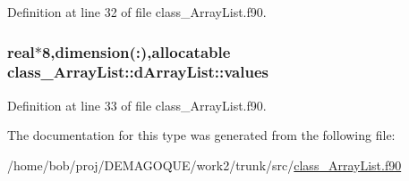 Definition at line 32 of file class\_\-ArrayList.f90.

\hypertarget{typeclass__ArrayList_1_1dArrayList_a7972abce1835eeb0be28d57f59de952e}{
\subsubsection[{values}]{\setlength{\rightskip}{0pt plus 5cm}real$\ast$8,dimension(:),allocatable {\bf class\_\-ArrayList::dArrayList::values}}}
\label{typeclass__ArrayList_1_1dArrayList_a7972abce1835eeb0be28d57f59de952e}


Definition at line 33 of file class\_\-ArrayList.f90.



The documentation for this type was generated from the following file:\begin{DoxyCompactItemize}
\item 
/home/bob/proj/DEMAGOQUE/work2/trunk/src/\hyperlink{class__ArrayList_8f90}{class\_\-ArrayList.f90}\end{DoxyCompactItemize}
